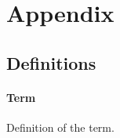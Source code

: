 \newpage

\section*{Appendix}


\subsection*{Definitions}

\paragraph{Term} Definition of the term.

\clearpage

\let\clearpage\relax